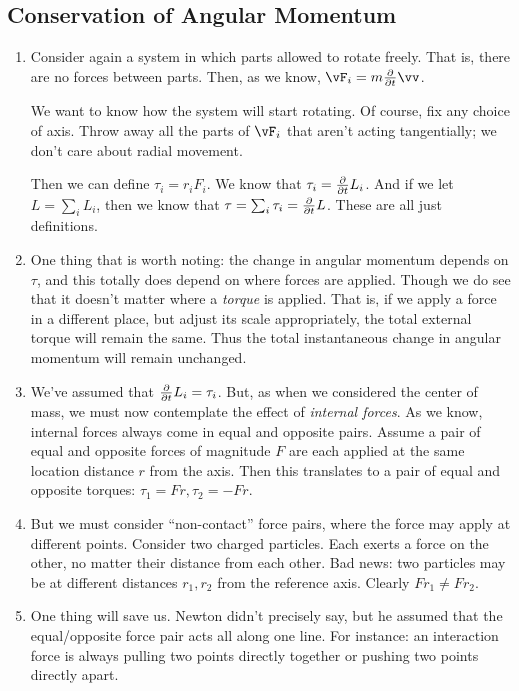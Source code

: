 \subsection{Conservation of Angular Momentum}

\begin{enumerate}
  \item Consider again a system in which parts allowed to rotate
  freely. That is, there are no forces between parts. Then, as we know,
  $\vF_i = m \fpartial{t} \vv$.

  We want to know how the system will start rotating. Of course, fix any
  choice of axis. Throw away all the parts of $\vF_i$ that aren't acting
  tangentially; we don't care about radial movement.

  Then we can define $\tau_i = r_i F_i$. We know that $\tau_i =
  \frac{\partial }{\partial t} L_i$. And if we let $L = \sum_i L_i$, then we know that
  $\tau = \sum_i \tau_i = \frac{\partial }{\partial t} L$. These are all just definitions.

  \item One thing that is worth noting: the change in angular momentum
  depends on $\tau$, and this totally does depend on where forces are
  applied. Though we do see that it doesn't matter where a \emph{torque}
  is applied. That is, if we apply a force in a different place, but
  adjust its scale appropriately, the total external torque will remain
  the same. Thus the total instantaneous change in angular momentum will
  remain unchanged.

  \item We've assumed that $\frac{\partial }{\partial t} L_i = \tau_i$. But, as when we
  considered the center of mass, we must now contemplate the effect of
  \emph{internal forces}. As we know, internal forces always come in
  equal and opposite pairs. Assume a pair of equal and opposite forces
  of magnitude $F$ are each applied at the same location distance $r$
  from the axis. Then this translates to a pair of equal and opposite
  torques: $\tau_1 = Fr, \tau_2 = -Fr$.

  \item But we must consider ``non-contact'' force pairs, where the
  force may apply at different points. Consider two charged particles.
  Each exerts a force on the other, no matter their distance from each
  other. Bad news: two particles may be at different distances $r_1,
  r_2$ from the reference axis. Clearly $Fr_1 \ne Fr_2$.

  \item One thing will save us. Newton didn't precisely say, but he
  assumed that the equal/opposite force pair acts all along one line.
  For instance: an interaction force is always pulling two points
  directly together or pushing two points directly apart.


\end{enumerate}
